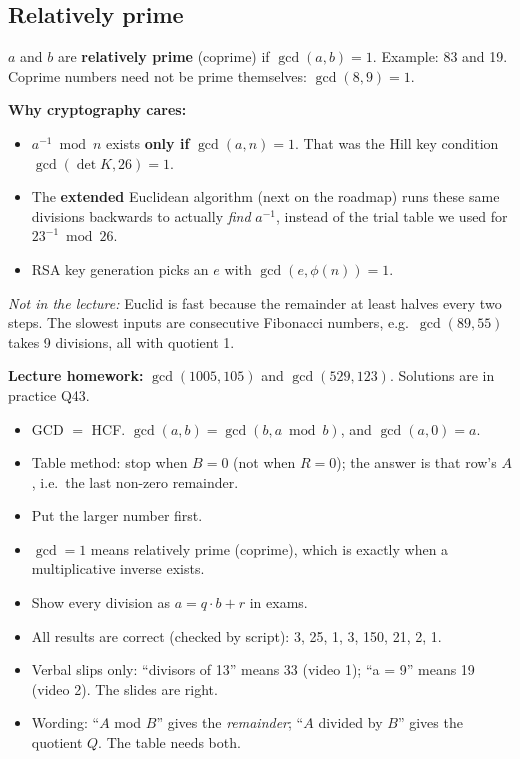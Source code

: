 \subsection{Relatively prime}
\begin{keybox}
$a$ and $b$ are \textbf{relatively prime} (coprime) if $\gcd(a, b) = 1$. Example: 83 and 19.
Coprime numbers need not be prime themselves: $\gcd(8, 9) = 1$.
\end{keybox}
\textbf{Why cryptography cares:}
\begin{itemize}
  \item $a^{-1} \bmod n$ exists \textbf{only if} $\gcd(a, n) = 1$. That was the Hill key condition $\gcd(\det K, 26) = 1$.
  \item The \textbf{extended} Euclidean algorithm (next on the roadmap) runs these same divisions backwards to actually \emph{find} $a^{-1}$, instead of the trial table we used for $23^{-1} \bmod 26$.
  \item RSA key generation picks an $e$ with $\gcd(e, \phi(n)) = 1$.
\end{itemize}
{\small\emph{Not in the lecture:} Euclid is fast because the remainder at least halves every two steps. The slowest inputs are consecutive Fibonacci numbers, e.g.\ $\gcd(89, 55)$ takes 9 divisions, all with quotient 1.}

\textbf{Lecture homework:} $\gcd(1005, 105)$ and $\gcd(529, 123)$. Solutions are in practice Q43.

\begin{examtip}
\begin{itemize}
  \item GCD $=$ HCF. $\gcd(a, b) = \gcd(b, a \bmod b)$, and $\gcd(a, 0) = a$.
  \item Table method: stop when $B = 0$ (not when $R = 0$); the answer is that row's $A$, i.e.\ the last non-zero remainder.
  \item Put the larger number first.
  \item $\gcd = 1$ means relatively prime (coprime), which is exactly when a multiplicative inverse exists.
  \item Show every division as $a = q\cdot b + r$ in exams.
\end{itemize}
\end{examtip}

\begin{fixbox}
\begin{itemize}
  \item All results are correct (checked by script): 3, 25, 1, 3, 150, 21, 2, 1.
  \item Verbal slips only: ``divisors of 13'' means 33 (video 1); ``a = 9'' means 19 (video 2). The slides are right.
  \item Wording: ``$A$ mod $B$'' gives the \emph{remainder}; ``$A$ divided by $B$'' gives the quotient $Q$. The table needs both.
\end{itemize}
\end{fixbox}
